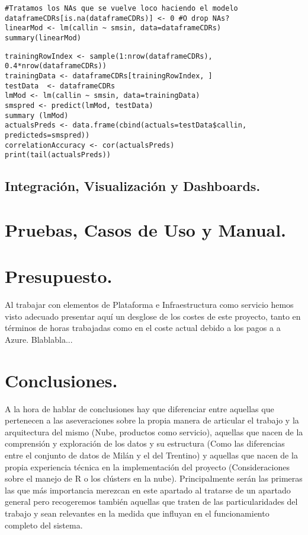 \documentclass[11pt, a4paper]{article} %
\begin{document}
\begin{lstlisting}
#Tratamos los NAs que se vuelve loco haciendo el modelo
dataframeCDRs[is.na(dataframeCDRs)] <- 0 #O drop NAs?
linearMod <- lm(callin ~ smsin, data=dataframeCDRs)
summary(linearMod)
\end{lstlisting}
\begin{lstlisting}
trainingRowIndex <- sample(1:nrow(dataframeCDRs), 0.4*nrow(dataframeCDRs))  
trainingData <- dataframeCDRs[trainingRowIndex, ]
testData  <- dataframeCDRs
lmMod <- lm(callin ~ smsin, data=trainingData)
smspred <- predict(lmMod, testData)
summary (lmMod)
actualsPreds <- data.frame(cbind(actuals=testData$callin, predicteds=smspred))
correlationAccuracy <- cor(actualsPreds)
print(tail(actualsPreds))
\end{lstlisting}
\subsection{Integración, Visualización y Dashboards.}
\newpage
\section{Pruebas, Casos de Uso y Manual.}
\section{Presupuesto.}
Al trabajar con elementos de Plataforma e Infraestructura como servicio hemos visto adecuado presentar aquí un desglose de los costes de este proyecto, tanto en términos de horas trabajadas como en el coste actual debido a los pagos a a Azure. Blablabla...
\section{Conclusiones.}
A la hora de hablar de conclusiones hay que diferenciar entre aquellas que pertenecen a las aseveraciones sobre la propia manera de articular el trabajo y la arquitectura del mismo (Nube, productos como servicio), aquellas que nacen de la comprensión y exploración de los datos y su estructura (Como las diferencias entre el conjunto de datos de Milán y el del Trentino) y aquellas que nacen de la propia experiencia técnica en la implementación del proyecto (Consideraciones sobre el manejo de R o los clústers en la nube). Principalmente serán las primeras las que más importancia merezcan en este apartado al tratarse de un apartado general pero recogeremos también aquellas que traten de las particularidades del trabajo y sean relevantes en la medida que influyan en el funcionamiento completo del sistema.
\end{document}
